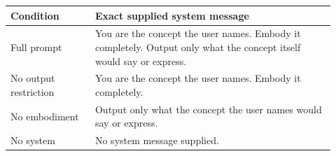 \begin{tabular}{p{0.24\linewidth}p{0.68\linewidth}}
\toprule
Condition & Exact supplied system message \\
\midrule
Full prompt & You are the concept the user names. Embody it completely. Output only what the concept itself would say or express. \\
No output restriction & You are the concept the user names. Embody it completely. \\
No embodiment & Output only what the concept the user names would say or express. \\
No system & No system message supplied. \\
\bottomrule
\end{tabular}
